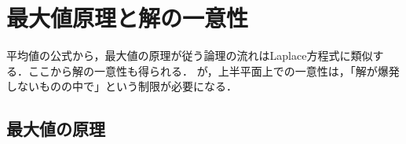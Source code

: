 \documentclass[uplatex,dvipdfmx]{jsreport}
\begin{document}
\section{最大値原理と解の一意性}

\begin{tcolorbox}[colframe=ForestGreen, colback=ForestGreen!10!white,breakable,colbacktitle=ForestGreen!40!white,coltitle=black,fonttitle=\bfseries\sffamily,
title=]
    平均値の公式から，最大値の原理が従う論理の流れはLaplace方程式に類似する．ここから解の一意性も得られる．
    が，上半平面上での一意性は，「解が爆発しないものの中で」という制限が必要になる．
\end{tcolorbox}

\subsection{最大値の原理}
\end{document}
